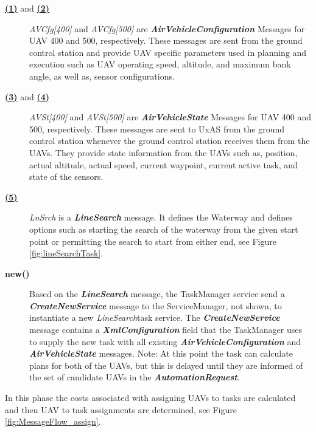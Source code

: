 \begin{description}
	\item[\hyperlink{msg:01.AirVehicleConfiguration.400}{\textbf{(1)}} and \hyperlink{msg:02.AirVehicleConfiguration.500}{\textbf{(2)}} ]  \textit{AVCfg[400]} and \textit{AVCfg[500]} are \textbf{\textit{AirVehicleConfiguration}} Messages for UAV 400 and 500, respectively. These messages are sent from the ground control station and provide UAV specific parameters used in planning and execution such as UAV operating speed, altitude, and maximum bank angle, as well as, sensor configurations.
	
	\item[\hyperlink{msg:03.AirVehicleState.400}{\textbf{(3)}} and \hyperlink{msg:04.AirVehicleState.500}{\textbf{(4)}} ]  \textit{AVSt[400]} and \textit{AVSt[500]} are \textbf{\textit{AirVehicleState}} Messages for UAV 400 and 500, respectively. These messages are sent to UxAS from the ground control station whenever the ground control station receives them from the UAVs. They provide state information from the UAVs such as, position, actual altitude, actual speed, current waypoint, current active task, and state of the sensors.

	\item[\hyperlink{msg:05.LineSearchTask}{\textbf{(5)}}] \textit{LnSrch} is a \textbf{\textit{LineSearch}} message. It defines the Waterway and defines options such as starting the search of the waterway from the given start point or permitting the search to start from either end, see Figure \ref{fig:lineSearchTask}.
	
	\item[\textbf{new()}] Based on the \textbf{\textit{LineSearch}} message, the TaskManager service send a \textbf{\textit{CreateNewService}} message to the ServiceManager, not shown, to instantiate a new \textit{LineSearch}task service. The \textbf{\textit{CreateNewService}} message contains a \textbf{\textit{XmlConfiguration}} field that the TaskManager uses to supply the new task with all existing \textbf{\textit{AirVehicleConfiguration}} and \textbf{\textit{AirVehicleState}} messages. Note: At this point the task can calculate plans for both of the UAVs, but this is delayed until they are informed of the set of candidate UAVs in the \textbf{\textit{AutomationRequest}}. 
\end{description}
In this phase the costs associated with assigning UAVs to tasks are calculated and then UAV to task assignments are determined, see Figure \ref{fig:MessageFlow_assign}.
